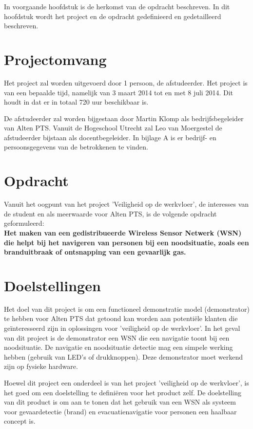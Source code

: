 \documentclass{../local}
\begin{document}
In voorgaande hoofdstuk is de herkomst van de  opdracht beschreven. In dit hoofdstuk wordt het project en de opdracht gedefinieerd en gedetailleerd beschreven.

\section{Projectomvang}
Het project zal worden uitgevoerd door 1 persoon, de afstudeerder. Het project is van een bepaalde tijd, namelijk van 3 maart 2014 tot en met 8 juli 2014. Dit houdt in dat er in totaal 720 uur beschikbaar is.

De afstudeerder zal worden bijgestaan door Martin Klomp als bedrijfsbegeleider van Alten PTS. Vanuit de Hogeschool Utrecht zal Leo van Moergestel de afstudeerder bijstaan als docentbegeleider. In bijlage A is er bedrijf- en persoonsgegevens van de betrokkenen te vinden.

\section{Opdracht}
Vanuit het oogpunt van het project 'Veiligheid op de werkvloer', de interesses van de student en als meerwaarde voor Alten PTS, is de volgende opdracht geformuleerd: \\
\textbf{Het maken van een gedistribueerde Wireless Sensor Netwerk (WSN) die helpt bij het navigeren van personen bij een noodsituatie, zoals een branduitbraak of ontsnapping van een gevaarlijk gas.}

\section{Doelstellingen}

Het doel van dit project is om een functioneel demonstratie model (demonstrator) te hebben voor Alten PTS dat getoond kan worden aan potentiële klanten die geïnteresseerd zijn in oplossingen voor 'veiligheid op de werkvloer'. In het geval van dit project is de demonstrator een WSN die een navigatie toont bij een noodsituatie. De navigatie en noodsituatie detectie mag een simpele werking hebben (gebruik van LED's of drukknoppen). Deze demonstrator moet werkend zijn op fysieke hardware. 

Hoewel dit project een onderdeel is van het project 'veiligheid op de werkvloer', is het goed om een doelstelling te definiëren voor het product zelf. De doelstelling van dit product is om aan te tonen dat het gebruik van een WSN als systeem voor gevaardetectie (brand) en evacuatienavigatie voor personen een haalbaar concept is.
\end{document}
